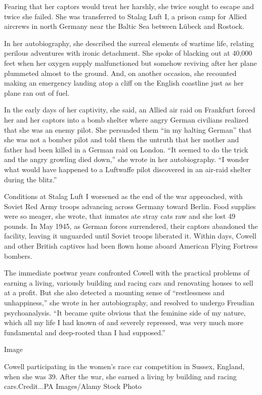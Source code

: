 Fearing that her captors would treat her harshly, she twice sought to
escape and twice she failed. She was transferred to Stalag Luft I, a
prison camp for Allied aircrews in north Germany near the Baltic Sea
between Lübeck and Rostock.

In her autobiography, she described the surreal elements of wartime
life, relating perilous adventures with ironic detachment. She spoke of
blacking out at 40,000 feet when her oxygen supply malfunctioned but
somehow reviving after her plane plummeted almost to the ground. And, on
another occasion, she recounted making an emergency landing atop a cliff
on the English coastline just as her plane ran out of fuel.

In the early days of her captivity, she said, an Allied air raid on
Frankfurt forced her and her captors into a bomb shelter where angry
German civilians realized that she was an enemy pilot. She persuaded
them ``in my halting German'' that she was not a bomber pilot and told
them the untruth that her mother and father had been killed in a German
raid on London. ``It seemed to do the trick and the angry growling died
down,'' she wrote in her autobiography. ``I wonder what would have
happened to a Luftwaffe pilot discovered in an air-raid shelter during
the blitz.''

Conditions at Stalag Luft I worsened as the end of the war approached,
with Soviet Red Army troops advancing across Germany toward Berlin. Food
supplies were so meager, she wrote, that inmates ate stray cats raw and
she lost 49 pounds. In May 1945, as German forces surrendered, their
captors abandoned the facility, leaving it unguarded until Soviet troops
liberated it. Within days, Cowell and other British captives had been
flown home aboard American Flying Fortress bombers.

The immediate postwar years confronted Cowell with the practical
problems of earning a living, variously building and racing cars and
renovating houses to sell at a profit. But she also detected a mounting
sense of ``restlessness and unhappiness,'' she wrote in her
autobiography, and resolved to undergo Freudian psychoanalysis. ``It
became quite obvious that the feminine side of my nature, which all my
life I had known of and severely repressed, was very much more
fundamental and deep-rooted than I had supposed.''

Image

Cowell participating in the women's race car competition in Sussex,
England, when she was 39. After the war, she earned a living by building
and racing cars.Credit...PA Images/Alamy Stock Photo

